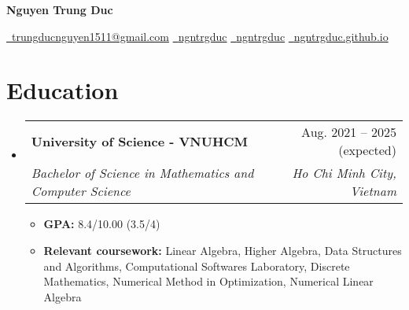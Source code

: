 \documentclass[letterpaper,11pt]{article}
\makeatletter
\newcommand{\heading}[4]{
    \normalsize
    \begin{tabular*}{0.97\textwidth}[t]{l@{\extracolsep{\fill}}r}
      \textbf{#1} & #2 \\[-2pt]
      \textit{\small#3} & \textit{\small #4}
    \end{tabular*}
    \vspace{-2pt}
}
\makeatother
\begin{document}
\begin{center}
    {\Huge \textbf{Nguyen Trung Duc}} \\
    \vspace{0.7em}
    
    \href{mailto:trungducnguyen1511@gmail.com}{\faEnvelope\ trungducnguyen1511@gmail.com} \quad
    \href{https://www.linkedin.com/in/ngntrgduc/}{\faLinkedin\ {ngntrgduc}} 
    \quad
    \href{https://github.com/ngntrgduc}{\faGithub\ {ngntrgduc}}
    \quad
    \href{https://ngntrgduc.github.io/}{\faHome\ {ngntrgduc.github.io}}
\end{center}




\section{Education}
    \begin{itemize}
        \item \heading{University of Science - VNUHCM}{Aug. 2021 -- 2025 (expected)}
          {Bachelor of Science in Mathematics and Computer Science}{Ho Chi Minh City, Vietnam}
        \begin{itemize}
            \item \textbf{GPA:} 8.4/10.00 (3.5/4)
            \item \textbf{Relevant coursework:}
            Linear Algebra, 
            Higher Algebra, 
            Data Structures and Algorithms, 
            Computational Softwares Laboratory, 
            Discrete Mathematics, 
            Numerical Method in Optimization, 
            Numerical Linear Algebra
        \end{itemize}
  \end{itemize}
\end{document}
